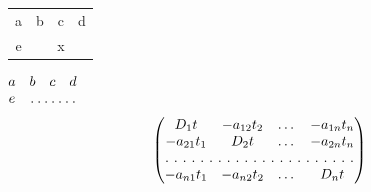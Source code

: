 \documentclass{article}
\begin{document}
\noindent\vbox{}

\begin{tabular}{|c|c|c|c|}a&b&c&d\\ e&\multicolumn{3}{c|}{\hrulefill x\hrulefill}\\\end{tabular}

\noindent$\begin{matrix} a&b&c&d\\
e&\hdotsfor{3} \end{matrix}$
\[\begin{pmatrix} D_1t&-a_{12}t_2&\dots&-a_{1n}t_n\\
-a_{21}t_1&D_2t&\dots&-a_{2n}t_n\\
\hdotsfor[2]{4}\\
-a_{n1}t_1&-a_{n2}t_2&\dots&D_nt\end{pmatrix}\]
\end{document}
